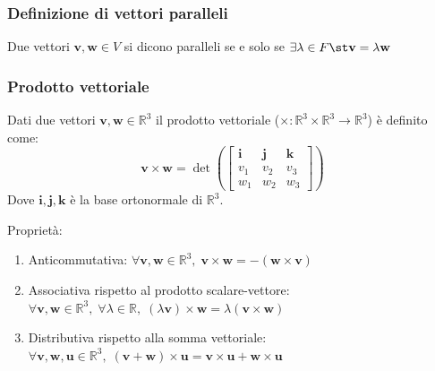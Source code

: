     \subsubsection{Definizione di vettori paralleli} \label{subsubsec:vsparallel}
        Due vettori $\mathbf{v}, \mathbf{w} \in V$ si dicono paralleli se e solo se $\exists \lambda \in F \st \mathbf{v} = \lambda \mathbf{w}$

    \subsubsection{Prodotto vettoriale} \label{subsubsec:vscross}
        Dati due vettori $\mathbf{v}, \mathbf{w} \in \mathbb{R}^3$ il prodotto vettoriale ($\times : \mathbb{R}^3 \times \mathbb{R}^3 \rightarrow \mathbb{R}^3$) è definito come:
        \[
            \mathbf{v} \times \mathbf{w} = \det \left(
            \begin{bmatrix}
                \mathbf{i} & \mathbf{j} & \mathbf{k} \\
                v_1 & v_2 & v_3 \\
                w_1 & w_2 & w_3
            \end{bmatrix}
            \right)
        \]
        Dove $\mathbf{i}, \mathbf{j}, \mathbf{k}$ è la base ortonormale di $\mathbb{R}^3$.

        \vspace{5pt}
        Proprietà:
        \begin{enumerate}[label=(\arabic*)]
            \item Anticommutativa: $\forall \mathbf{v}, \mathbf{w} \in \mathbb{R}^3, \; \mathbf{v} \times \mathbf{w} = -(\mathbf{w} \times \mathbf{v})$
            \item Associativa rispetto al prodotto scalare-vettore: $\forall \mathbf{v}, \mathbf{w} \in \mathbb{R}^3, \; \forall \lambda \in \mathbb{R}, \; (\lambda\mathbf{v}) \times \mathbf{w} = \lambda(\mathbf{v} \times \mathbf{w})$
            \item Distributiva rispetto alla somma vettoriale: $\forall \mathbf{v}, \mathbf{w}, \mathbf{u} \in \mathbb{R}^3, \; (\mathbf{v} + \mathbf{w}) \times \mathbf{u} = \mathbf{v} \times \mathbf{u} + \mathbf{w} \times \mathbf{u}$
        \end{enumerate}

